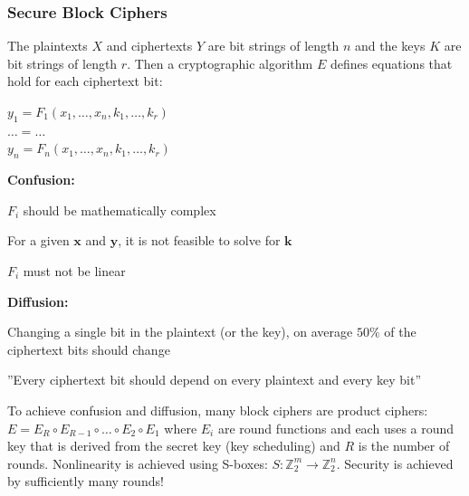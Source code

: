 \subsubsection{Secure Block Ciphers}
The plaintexts $X$ and ciphertexts $Y$ are bit strings of length $n$ and the keys $K$ are bit strings of length $r$. Then a cryptographic algorithm $E$ defines equations that hold for each ciphertext bit:\\
\begin{minipage}{0.25\linewidth}
$y_1 = F_1(x_1,\ldots,x_n,k_1,\ldots,k_r)$\\
$\ldots = \ldots$\\
$y_n = F_n(x_1,\ldots,x_n,k_1,\ldots,k_r)$
\end{minipage}
\begin{minipage}{0.35\linewidth}
\textbf{Confusion:}
\begin{liste}
	\item $F_i$ should be mathematically complex
	\item For a given $\mathbf{x}$ and $\mathbf{y}$, it is not feasible to solve for $\mathbf{k}$
	\item $F_i$ must not be linear
\end{liste}
\end{minipage}
\begin{minipage}{0.35\linewidth}
\textbf{Diffusion:}
\begin{liste}
	\item Changing a single bit in the plaintext (or the key), on average $50\%$ of the ciphertext bits should change
	\item ''Every ciphertext bit should depend on every plaintext and every key bit''
\end{liste}
\end{minipage}

To achieve confusion and diffusion, many block ciphers are product ciphers: $E = E_R \circ E_{R-1} \circ \ldots \circ E_2 \circ E_1$ where $E_i$ are round functions and each uses a round key that is derived from the secret key (key scheduling) and $R$ is the number of rounds.
Nonlinearity is achieved using S-boxes: $S: \mathbb{Z}_2^m \rightarrow \mathbb{Z}_2^n$.
Security is achieved by sufficiently many rounds!


